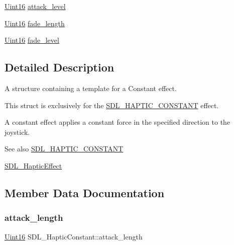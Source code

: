 \begin{DoxyCompactItemize}
\item 
\mbox{\hyperlink{_s_d_l__stdinc_8h_a31fcc0a076c9068668173ee26d33e42b}{Uint16}} \mbox{\hyperlink{struct_s_d_l___haptic_constant_a0928a37f3fab0e5b7daffc7a1d65744c}{attack\+\_\+level}}
\item 
\mbox{\hyperlink{_s_d_l__stdinc_8h_a31fcc0a076c9068668173ee26d33e42b}{Uint16}} \mbox{\hyperlink{struct_s_d_l___haptic_constant_a647a6b761ac6ba16160d0892a12806bc}{fade\+\_\+length}}
\item 
\mbox{\hyperlink{_s_d_l__stdinc_8h_a31fcc0a076c9068668173ee26d33e42b}{Uint16}} \mbox{\hyperlink{struct_s_d_l___haptic_constant_a49f6499c89f3e494efbe92f12277c949}{fade\+\_\+level}}
\end{DoxyCompactItemize}


\subsection{Detailed Description}
A structure containing a template for a Constant effect. 

This struct is exclusively for the \mbox{\hyperlink{_s_d_l__haptic_8h_a955fb9f680dcf9cc72a3d5263e85b80a}{S\+D\+L\+\_\+\+H\+A\+P\+T\+I\+C\+\_\+\+C\+O\+N\+S\+T\+A\+NT}} effect.

A constant effect applies a constant force in the specified direction to the joystick.

\begin{DoxySeeAlso}{See also}
\mbox{\hyperlink{_s_d_l__haptic_8h_a955fb9f680dcf9cc72a3d5263e85b80a}{S\+D\+L\+\_\+\+H\+A\+P\+T\+I\+C\+\_\+\+C\+O\+N\+S\+T\+A\+NT}} 

\mbox{\hyperlink{union_s_d_l___haptic_effect}{S\+D\+L\+\_\+\+Haptic\+Effect}} 
\end{DoxySeeAlso}


\subsection{Member Data Documentation}
\mbox{\label{struct_s_d_l___haptic_constant_a907bade68ab53fb24e7d2651d19b767f}} 
\subsubsection{\texorpdfstring{attack\+\_\+length}{attack\_length}}
{\footnotesize\ttfamily \mbox{\hyperlink{_s_d_l__stdinc_8h_a31fcc0a076c9068668173ee26d33e42b}{Uint16}} S\+D\+L\+\_\+\+Haptic\+Constant\+::attack\+\_\+length}

